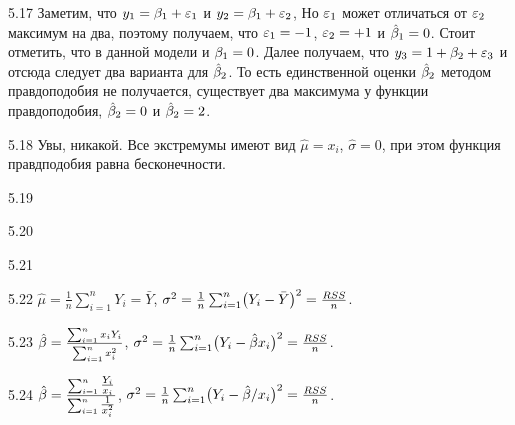 \protect \hypertarget {soln:5.17}{}
\begin{solution}{{5.17}}
Заметим, что $y_1=\beta_1+\varepsilon_1$ и $y_2=\beta_1 + \varepsilon_2$, Но $\varepsilon_1$ может отличаться от $\varepsilon_2$ максимум на два, поэтому получаем, что $\varepsilon_1=-1$, $\varepsilon_2=+1$ и $\hat{\beta}_1=0$. Стоит отметить, что в данной модели и $\beta_1=0$.
Далее получаем, что $y_3=1+\beta_2 + \varepsilon_3$ и отсюда следует два варианта для $\hat{\beta}_2$. То есть единственной оценки $\hat{\beta}_2$ методом правдоподобия не получается, существует два максимума у функции правдоподобия, $\hat{\beta}_2=0$ и $\hat{\beta}_2=2$.
\end{solution}
\protect \hypertarget {soln:5.18}{}
\begin{solution}{{5.18}}
Увы, никакой. Все экстремумы имеют вид $\hat{\mu}=x_i$, $\hat{\sigma}=0$, при этом функция правдподобия равна бесконечности.
\end{solution}
\protect \hypertarget {soln:5.19}{}
\begin{solution}{{5.19}}
\end{solution}
\protect \hypertarget {soln:5.20}{}
\begin{solution}{{5.20}}
\end{solution}
\protect \hypertarget {soln:5.21}{}
\begin{solution}{{5.21}}
\end{solution}
\protect \hypertarget {soln:5.22}{}
\begin{solution}{{5.22}}
$\widehat{\mu} = \tfrac{1}{n}\sum_{i=1}^{n}Y_i = \bar{Y}$, \;\; $\sigma^2 = \tfrac{1}{n}\sum_{i=1}^{n}\bigl(Y_i - \bar{Y}\bigr)^2 = \tfrac{RSS}{n}$.
\end{solution}
\protect \hypertarget {soln:5.23}{}
\begin{solution}{{5.23}}
$\hat{\beta} = \tfrac{\bigl. \sum_{i=1}^{n}x_i Y_i}{\bigl. \sum_{i=1}^{n}x_i^2}$, \;\; $\sigma^2 = \tfrac{1}{n}\sum_{i=1}^{n}\bigl(Y_i - \hat{\beta} x_i\bigr)^2 = \tfrac{RSS}{n}$.
\end{solution}
\protect \hypertarget {soln:5.24}{}
\begin{solution}{{5.24}}
$\hat{\beta} = \tfrac{\bigl. \sum_{i=1}^{n}\tfrac{Y_i}{x_i}}{\bigl. \sum_{i=1}^{n}\tfrac{1}{x_i^2}}$, \;\; $\sigma^2 = \tfrac{1}{n}\sum_{i=1}^{n}\bigl(Y_i - \hat{\beta} / x_i\bigr)^2 = \tfrac{RSS}{n}$.
\end{solution}
\protect \hypertarget {soln:5.25}{}
